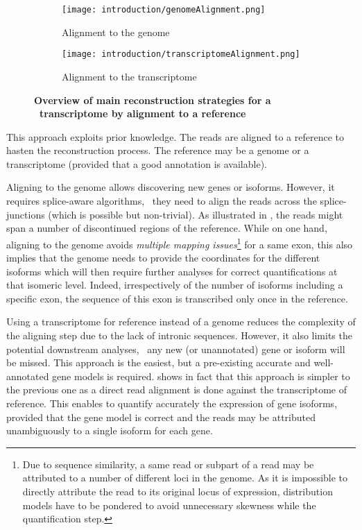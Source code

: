 \begin{figure}
    \centering
    \begin{subfigure}{1.1\textwidth}\label{fig:genoAlignment}
        \texttt{[image: introduction/genomeAlignment.png]}\centering
        \caption{Alignment to the genome}
    \end{subfigure}

    \begin{subfigure}{1.1\textwidth}\label{fig:transAlignment}
        \texttt{[image: introduction/transcriptomeAlignment.png]}\centering
        \caption{Alignment to the transcriptome}
    \end{subfigure}
    \caption[Overview of main alignment strategies for \Rnaseq\
    transcriptome]{\label{fig:OverviewRnaseqMapping}\textbf{Overview of main
    reconstruction strategies for a \Rnaseq\ transcriptome by alignment to a
    reference}}
\end{figure}


This approach exploits prior knowledge. The reads are aligned to a reference to
hasten the reconstruction process. The reference may be a genome or a
transcriptome (provided that a good annotation is available).


Aligning to the genome allows discovering new genes or isoforms. However, it
requires splice-aware algorithms, \ie\ they need to align the
reads across the splice-junctions (which is possible but non-trivial).
As illustrated in \Cref{fig:genoAlignment},
the reads might span a number of discontinued regions of the reference.
While on one hand, aligning to the genome avoids \emph{multiple mapping
issues}\footnote{Due to sequence similarity, a same read or subpart of a read
may be attributed to a number of different loci in the genome. As it is
impossible to directly attribute the read to its original locus of expression,
distribution models have to be pondered to avoid unnecessary skewness while
the quantification step.} for a same exon, this also implies that
the genome needs to provide the coordinates for the different isoforms
which will then require further analyses for correct quantifications at that
isomeric level.
Indeed, irrespectively of the number of isoforms including a specific exon,
the sequence of this exon is transcribed only once in the reference.


Using a transcriptome for reference instead of a genome reduces the complexity
of the aligning step due to the lack of intronic sequences. However, it also
limits the potential downstream analyses, \eg\ any new (or unannotated) gene
or isoform will be missed. This approach is the easiest, but a pre-existing
accurate and well-annotated gene models is required.
 shows in fact that this approach is simpler
to the previous one as a direct read alignment is done against the
transcriptome of reference. This enables to quantify accurately the expression
of gene isoforms, provided that the gene model is correct and the reads may be
attributed unambiguously to a single isoform for each gene.

